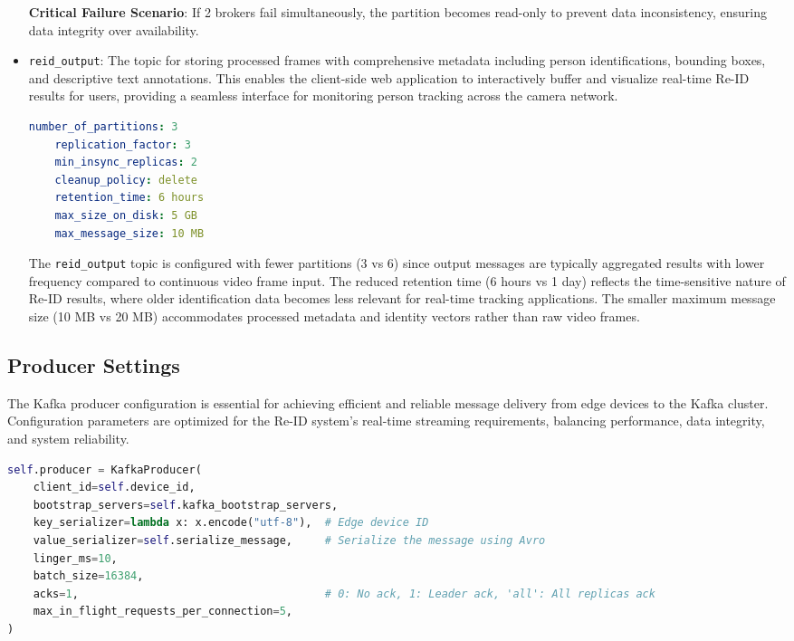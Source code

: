 \documentclass[../main.tex]{subfiles}
\begin{document}
\begin{itemize}
    \textbf{Critical Failure Scenario}: If 2 brokers fail simultaneously, the partition becomes read-only to prevent data inconsistency, ensuring data integrity over availability.
    
    \item \texttt{reid\_output}: The topic for storing processed frames with comprehensive metadata including person identifications, bounding boxes, and descriptive text annotations. This enables the client-side web application to interactively buffer and visualize real-time Re-ID results for users, providing a seamless interface for monitoring person tracking across the camera network.
    
    \begin{lstlisting}[language=yaml, caption={Topic settings for \texttt{reid\_output}}]
    number_of_partitions: 3
    replication_factor: 3
    min_insync_replicas: 2
    cleanup_policy: delete
    retention_time: 6 hours
    max_size_on_disk: 5 GB
    max_message_size: 10 MB
    \end{lstlisting}
    
    The \texttt{reid\_output} topic is configured with fewer partitions (3 vs 6) since output messages are typically aggregated results with lower frequency compared to continuous video frame input. The reduced retention time (6 hours vs 1 day) reflects the time-sensitive nature of Re-ID results, where older identification data becomes less relevant for real-time tracking applications. The smaller maximum message size (10 MB vs 20 MB) accommodates processed metadata and identity vectors rather than raw video frames.
\end{itemize}

\subsection{Producer Settings}

The Kafka producer configuration is essential for achieving efficient and reliable message delivery from edge devices to the Kafka cluster. Configuration parameters are optimized for the Re-ID system's real-time streaming requirements, balancing performance, data integrity, and system reliability.\\

\begin{lstlisting}[language=Python, caption={Kafka producer configuration for edge devices}]
self.producer = KafkaProducer(
    client_id=self.device_id,
    bootstrap_servers=self.kafka_bootstrap_servers,
    key_serializer=lambda x: x.encode("utf-8"),  # Edge device ID
    value_serializer=self.serialize_message,     # Serialize the message using Avro
    linger_ms=10,
    batch_size=16384,
    acks=1,                                      # 0: No ack, 1: Leader ack, 'all': All replicas ack
    max_in_flight_requests_per_connection=5,
)
\end{lstlisting}
\end{document}
